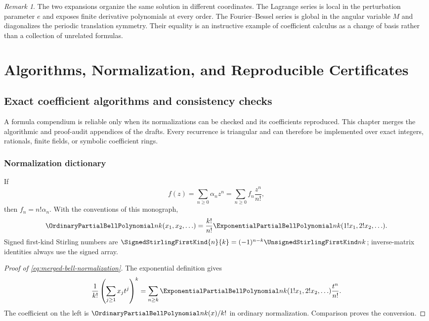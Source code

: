 \documentclass[11pt,a4paper,oneside,openany]{book}
\theoremstyle{definition}
\theoremstyle{remark}
\newtheorem{remark}[theorem]{Remark}
\begin{document}
\begin{remark}
The two expansions organize the same solution in different coordinates.  The
Lagrange series is local in the perturbation parameter $e$ and exposes finite
derivative polynomials at every order.  The Fourier--Bessel series is global
in the angular variable $M$ and diagonalizes the periodic translation
symmetry.  Their equality is an instructive example of coefficient calculus
as a change of basis rather than a collection of unrelated formulas.
\end{remark}

\part{Algorithms, Normalization, and Reproducible Certificates}

\chapter{Exact coefficient algorithms and consistency checks}
\label{ch:merged-algorithms}

A formula compendium is reliable only when its normalizations can be checked
and its coefficients reproduced.  This chapter merges the algorithmic and
proof-audit appendices of the drafts.  Every recurrence is triangular and can
therefore be implemented over exact integers, rationals, finite fields, or
symbolic coefficient rings.

\section{Normalization dictionary}

\begin{auditbox}[title={Ordinary versus exponential coefficients}]
If
\[
 f(z)=\sum_{n\geq0}\alpha_nz^n
     =\sum_{n\geq0}f_n\frac{z^n}{n!},
\]
then $f_n=n!\alpha_n$.  With the conventions of this monograph,
\begin{equation}
 \OrdinaryPartialBellPolynomial nk(x_1,x_2,\ldots)
 =\frac{k!}{n!}\ExponentialPartialBellPolynomial nk(1!x_1,2!x_2,\ldots).                      \label{eq:merged-bell-normalization}
\end{equation}
Signed first-kind Stirling numbers are
$\SignedStirlingFirstKind{n}{k}=(-1)^{n-k}\UnsignedStirlingFirstKind nk$; inverse-matrix identities always use the
signed array.
\end{auditbox}

\begin{proof}[Proof of \eqref{eq:merged-bell-normalization}]
The exponential definition gives
\[
 \frac1{k!}\left(\sum_{j\geq1}x_jt^j\right)^k
 =\sum_{n\geq k}\ExponentialPartialBellPolynomial nk(1!x_1,2!x_2,\ldots)\frac{t^n}{n!}.
\]
The coefficient on the left is $\OrdinaryPartialBellPolynomial nk(x)/k!$ in ordinary normalization.
Comparison proves the conversion.
\end{proof}
\end{document}
